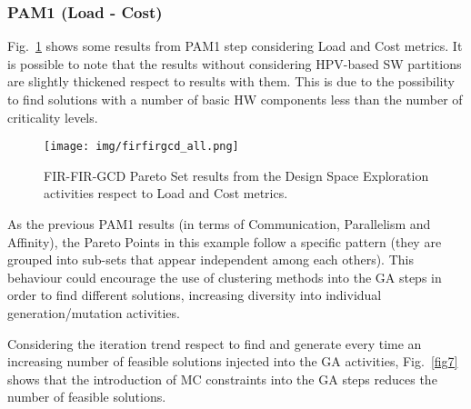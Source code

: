\subsubsection{PAM1 (Load - Cost)}
%
Fig.~\ref{fig8_a} shows some results from PAM1 step considering Load and Cost metrics. It is possible to note that the results without considering HPV-based SW partitions are slightly thickened respect to results with them. This is due to the possibility to find solutions with a number of basic HW components less than the number of criticality levels.  \par
%
\begin{figure}[htbp]
	\centerline{\texttt{[image: img/firfirgcd\_all.png]}}
	\caption{FIR-FIR-GCD Pareto Set results from the Design Space Exploration activities respect to Load and Cost metrics.}
	\label{fig8_a}
\end{figure}
%
As the previous PAM1 results (in terms of Communication, Parallelism and Affinity), the Pareto Points in this example follow a specific pattern (they are grouped into sub-sets that appear independent among each others). This behaviour could encourage the use of clustering methods into the GA steps in order to find different solutions, increasing diversity into individual generation/mutation activities. \par
Considering the iteration trend respect to find and generate every time an increasing number of feasible solutions injected into the GA activities, Fig.~\ref{fig7} shows that the introduction of MC constraints into the GA steps reduces the number of feasible solutions. \par
%
\begin{figure*}[htbp]
    \centering
    \label{7a} \hfill 
    \label{7b}  \\
    \label{7c}\hfill
    \label{7d} \\
  \caption{Design space exploration trend considering each iteration and the percentage of feasible solutions found during each step of the genetic algorithm.}
  \label{fig7} 
\end{figure*}
